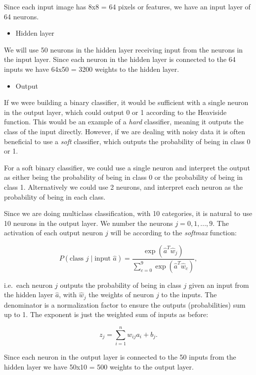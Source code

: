 \noindent
Since each input image has 8x8 = 64 pixels or features, we have an input layer of 64 neurons.  

\begin{itemize}
\item Hidden layer
\end{itemize}

\noindent
We will use 50 neurons in the hidden layer receiving input from the neurons in the input layer.  
Since each neuron in the hidden layer is connected to the 64 inputs we have 64x50 = 3200 weights to the hidden layer.  

\begin{itemize}
\item Output
\end{itemize}

\noindent
If we were building a binary classifier, it would be sufficient with a single neuron in the output layer,
which could output 0 or 1 according to the Heaviside function. This would be an example of a \emph{hard} classifier, meaning it outputs the class of the input directly. However, if we are dealing with noisy data it is often beneficial to use a \emph{soft} classifier, which outputs the probability of being in class 0 or 1.  

For a soft binary classifier, we could use a single neuron and interpret the output as either being the probability of being in class 0 or the probability of being in class 1. Alternatively we could use 2 neurons, and interpret each neuron as the probability of being in each class.  

Since we are doing multiclass classification, with 10 categories, it is natural to use 10 neurons in the output layer. We number the neurons $j = 0,1,...,9$. The activation of each output neuron $j$ will be according to the \emph{softmax} function:  

$$ P(\text{class $j$} \mid \text{input $\hat{a}$}) = \frac{\exp{(\hat{a}^T \hat{w}_j)}}
{\sum_{c=0}^{9} \exp{(\hat{a}^T \hat{w}_c)}} ,$$  

i.e.~each neuron $j$ outputs the probability of being in class $j$ given an input from the hidden layer $\hat{a}$, with $\hat{w}_j$ the weights of neuron $j$ to the inputs.  
The denominator is a normalization factor to ensure the outputs (probabilities) sum up to 1.  
The exponent is just the weighted sum of inputs as before:  

$$ z_j = \sum_{i=1}^n w_ {ij} a_i+b_j.$$  

Since each neuron in the output layer is connected to the 50 inputs from the hidden layer we have 50x10 = 500
weights to the output layer.

